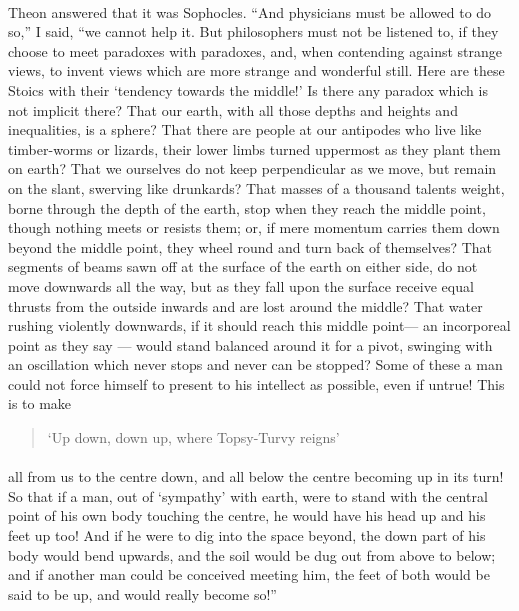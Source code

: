 \documentclass[a4paper, 11pt, oneside, polutonikogreek, english]{article}
\begin{document}
\paragraph{}
Theon answered that it was Sophocles. ``And physicians must be allowed to do so,'' I said, ``we cannot help it. But philosophers must not be listened to, if they choose to meet paradoxes with paradoxes, and, when contending against strange views, to invent views which are more strange and wonderful still. Here are these Stoics with their `tendency towards the middle!' Is there any paradox which is not implicit there? That our earth, with all those depths and heights and inequalities, is a sphere? That there are people at our antipodes who live like timber-worms or lizards, their lower limbs turned uppermost as they plant them on earth? That we ourselves do not keep perpendicular as we move, but remain on the slant, swerving like drunkards? That masses of a thousand talents weight, borne through the depth of the earth, stop when they reach the middle point, though nothing meets or resists them; or, if mere momentum carries them down beyond the middle point, they wheel round and turn back of themselves? That segments of beams sawn off at the surface of the earth on either side, do not move downwards all the way, but as they fall upon the surface receive equal thrusts from the outside inwards and are lost around the middle? That water rushing violently downwards, if it should reach this middle point--- an incorporeal point as they say --- would stand balanced around it for a pivot, swinging with an oscillation which never stops and never can be stopped? Some of these a man could not force himself to present to his intellect as possible, even if untrue! This is to make
\begin{quotation}
`Up down, down up, where Topsy-Turvy reigns'
\end{quotation}
\paragraph{}
all from us to the centre down, and all below the centre becoming up in its turn! So that if a man, out of `sympathy' with earth, were to stand with the central point of his own body touching the centre, he would have his head up and his feet up too! And if he were to dig into the space beyond, the down part of his body would bend upwards, and the soil would be dug out from above to below; and if another man could be conceived meeting him, the feet of both would be said to be up, and would really become so!''
\end{document}
